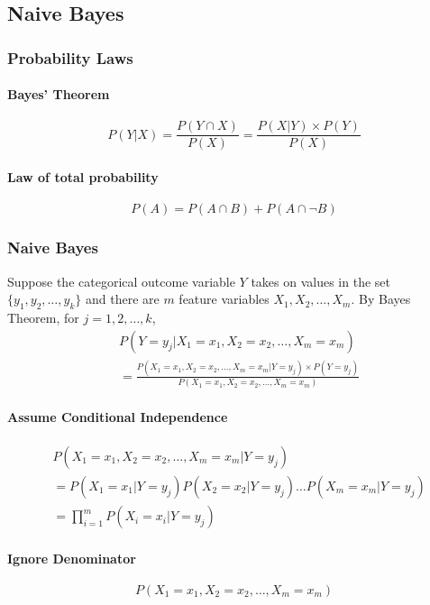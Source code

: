 \documentclass[../../dsa1101_notes.Rtex]{subfiles}\usepackage[]{graphicx}\usepackage[]{color}
\begin{document}
\subsection{Naive Bayes}

\subsubsection{Probability Laws}
\paragraph{Bayes' Theorem}
\[P(Y\vert X)=\frac{P(Y\cap X)}{P(X)}=\frac{P(X\vert Y)\times P(Y)}{P(X)}\]

\paragraph{Law of total probability}
\[P(A)=P(A\cap B)+P(A\cap \neg B)\]

\subsubsection{Naive Bayes}
Suppose the categorical outcome variable \(Y\) takes on values in the set \(\{y_1, y_2, \ldots, y_k\}\) and there are \(m\) feature variables \(X_1, X_2, \ldots, X_m\). By Bayes Theorem, for \(j=1,2,\ldots,k\),
\begin{align*}
&P(Y=y_j\vert X_1=x_1, X_2=x_2, \ldots, X_m=x_m)\\
&=\frac{P(X_1=x_1, X_2=x_2, \ldots, X_m=x_m\vert Y=y_j)\times P(Y=y_j)}{P(X_1=x_1, X_2=x_2, \ldots, X_m=x_m)}
\end{align*}

\paragraph{Assume Conditional Independence}
\begin{align*}
&P(X_1=x_1, X_2=x_2, \ldots, X_m=x_m\vert Y=y_j)\\
&=P(X_1=x_1\vert Y=y_j)P(X_2=x_2\vert Y=y_j)\ldots P(X_m=x_m\vert Y=y_j)\\
&=\prod_{i=1}^{m}P(X_i=x_i\vert Y=y_j)
\end{align*}

\paragraph{Ignore Denominator}
\[P(X_1=x_1, X_2=x_2, \ldots, X_m=x_m)\]
\end{document}
